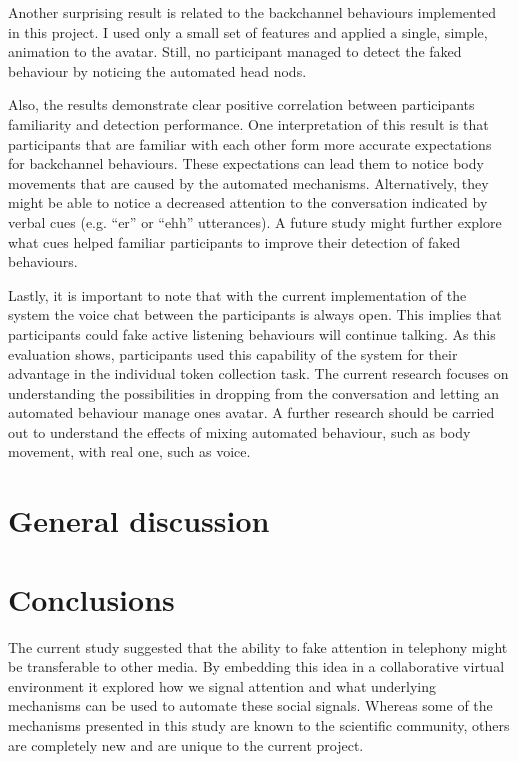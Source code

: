 \documentclass[]{simple-thesis}
\begin{document}
Another surprising result is related to the backchannel behaviours implemented in this project.
I used only a small set of features and applied a single, simple, animation to the avatar.
Still, no participant managed to detect the faked behaviour by noticing the automated head nods.

Also, the results demonstrate clear positive correlation between participants familiarity and detection performance.
One interpretation of this result is that participants that are familiar with each other form more accurate expectations for backchannel behaviours.
These expectations can lead them to notice body movements that are caused by the automated mechanisms.
Alternatively, they might be able to notice a decreased attention to the conversation indicated by verbal cues (e.g. ``er'' or ``ehh'' utterances).
A future study might further explore what cues helped familiar participants to improve their detection of faked behaviours.

Lastly, it is important to note that with the current implementation of the system the voice chat between the participants is always open.
This implies that participants could fake active listening behaviours will continue talking.
As this evaluation shows, participants used this capability of the system for their advantage in the individual token collection task.
The current research focuses on understanding the possibilities in dropping from the conversation and letting an automated behaviour manage ones avatar.
A further research should be carried out to understand the effects of mixing automated behaviour, such as body movement, with real one, such as voice.


\chapter{General discussion}\label{general_discussion}


\chapter{Conclusions}\label{conclusions}

The current study suggested that the ability to fake attention in telephony might be transferable to other media.
By embedding this idea in a collaborative virtual environment it explored how we signal attention and what underlying mechanisms can be used to automate these social signals.
Whereas some of the mechanisms presented in this study are known to the scientific community, others are completely new and are unique to the current project.
\end{document}

